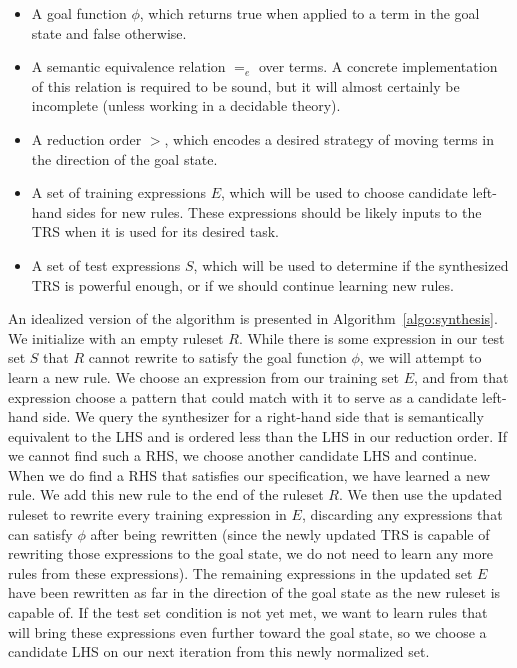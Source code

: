 \begin{itemize}
\item A goal function $\phi$, which returns true when applied to a term in the goal state and false otherwise. 
\item A semantic equivalence relation $=_e$ over terms. A concrete implementation of this relation is required to be sound, but it will almost certainly be incomplete (unless working in a decidable theory).
\item A reduction order $>$, which encodes a desired strategy of moving terms in the direction of the goal state.
\item A set of training expressions $E$, which will be used to choose candidate left-hand sides for new rules. These expressions should be likely inputs to the TRS when it is used for its desired task.
\item A set of test expressions $S$, which will be used to determine if the synthesized TRS is powerful enough, or if we should continue learning new rules.
\end{itemize}

An idealized version of the algorithm is presented in Algorithm~\ref{algo:synthesis}. We initialize with an empty ruleset $R$. While there is some expression in our test set $S$ that $R$ cannot rewrite to satisfy the goal function $\phi$, we will attempt to learn a new rule. We choose an expression from our training set $E$, and from that expression choose a pattern that could match with it to serve as a candidate left-hand side. We query the synthesizer for a right-hand side that is semantically equivalent to the LHS and is ordered less than the LHS in our reduction order. If we cannot find such a RHS, we choose another candidate LHS and continue. When we do find a RHS that satisfies our specification, we have learned a new rule. We add this new rule to the end of the ruleset $R$. We then use the updated ruleset to rewrite every training expression in $E$, discarding any expressions that can satisfy $\phi$ after being rewritten (since the newly updated TRS is capable of rewriting those expressions to the goal state, we do not need to learn any more rules from these expressions). The remaining expressions in the updated set $E$ have been rewritten as far in the direction of the goal state as the new ruleset is capable of. If the test set condition is not yet met, we want to learn rules that will bring these expressions even further toward the goal state, so we choose a candidate LHS on our next iteration from this newly normalized set.


